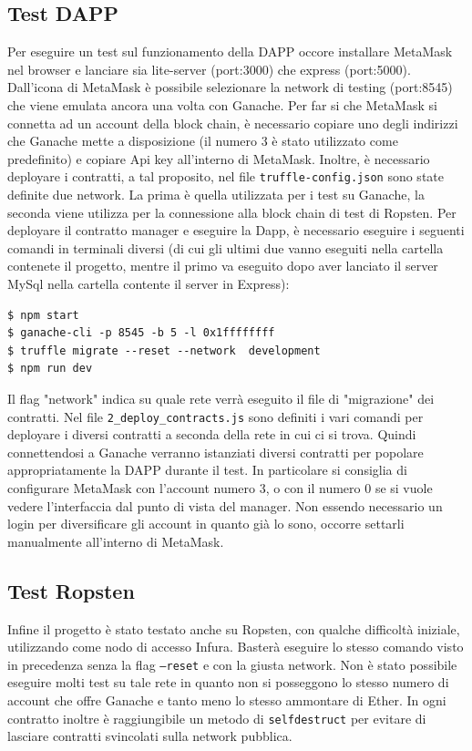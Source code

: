 \subsection{Test DAPP}
Per eseguire un test sul funzionamento della DAPP occore installare MetaMask nel browser e lanciare sia lite-server (port:3000) che express (port:5000). Dall'icona di MetaMask è possibile selezionare la network di testing (port:8545) che viene emulata ancora una volta con Ganache. Per far si che MetaMask si connetta ad un account della block chain, è necessario copiare uno degli indirizzi che Ganache mette a disposizione (il numero 3 è stato utilizzato come predefinito) e copiare Api key all'interno di MetaMask. Inoltre, è necessario deployare i contratti, a tal proposito, nel file \texttt{truffle-config.json} sono state definite due network. La prima è quella utilizzata per i test su Ganache, la seconda viene utilizza per la connessione alla block chain di test di Ropsten. Per deployare il contratto manager e eseguire la Dapp, è necessario eseguire i seguenti comandi in terminali diversi (di cui gli ultimi due vanno eseguiti nella cartella contenete il progetto, mentre il primo va eseguito dopo aver lanciato il server MySql nella cartella contente il server in Express):
\begin{verbatim}
$ npm start
$ ganache-cli -p 8545 -b 5 -l 0x1ffffffff
$ truffle migrate --reset --network  development
$ npm run dev
\end{verbatim}
Il flag "network" indica su quale rete verrà eseguito il file di "migrazione" dei contratti. Nel file \texttt{2\_deploy\_contracts.js} sono definiti i vari comandi per deployare i diversi contratti a seconda della rete in cui ci si trova. Quindi connettendosi a Ganache verranno istanziati diversi contratti per popolare appropriatamente la DAPP durante il test. In particolare si consiglia di configurare MetaMask con l'account numero 3, o con il numero 0 se si vuole vedere l'interfaccia dal punto di vista del manager. Non essendo necessario un login per diversificare gli account in quanto già lo sono, occorre settarli manualmente all'interno di MetaMask.
\subsection{Test Ropsten}
Infine il progetto è stato testato anche su Ropsten, con qualche difficoltà iniziale, utilizzando come nodo di accesso Infura. Basterà eseguire lo stesso comando visto in precedenza senza la flag \texttt{--reset} e con la giusta network. Non è stato possibile eseguire molti test su tale rete in quanto non si posseggono lo stesso numero di account che offre Ganache e tanto meno lo stesso ammontare di Ether. In ogni contratto inoltre è raggiungibile un metodo di \texttt{selfdestruct} per evitare di lasciare contratti svincolati sulla network pubblica.